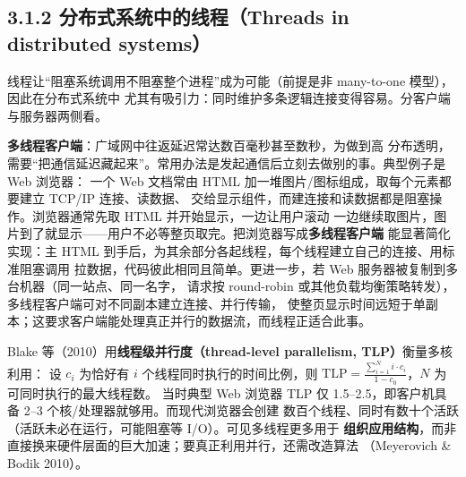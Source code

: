 \begin{closeread}
\end{closeread}


\subsection*{3.1.2 分布式系统中的线程（Threads in distributed systems）}
线程让“阻塞系统调用不阻塞整个进程”成为可能（前提是非 many-to-one 模型），因此在分布式系统中
尤其有吸引力：同时维护多条逻辑连接变得容易。分客户端与服务器两侧看。

\medskip\noindent\textbf{多线程客户端}：广域网中往返延迟常达数百毫秒甚至数秒，为做到高
分布透明，需要“把通信延迟藏起来”。常用办法是发起通信后立刻去做别的事。典型例子是 Web 浏览器：
一个 Web 文档常由 HTML 加一堆图片/图标组成，取每个元素都要建立 TCP/IP 连接、读数据、
交给显示组件，而建连接和读数据都是阻塞操作。浏览器通常先取 HTML 并开始显示，一边让用户滚动
一边继续取图片，图片到了就显示——用户不必等整页取完。把浏览器写成\textbf{多线程客户端}
能显著简化实现：主 HTML 到手后，为其余部分各起线程，每个线程建立自己的连接、用标准阻塞调用
拉数据，代码彼此相同且简单。更进一步，若 Web 服务器被复制到多台机器（同一站点、同一名字，
请求按 round-robin 或其他负载均衡策略转发），多线程客户端可对不同副本建立连接、并行传输，
使整页显示时间远短于单副本；这要求客户端能处理真正并行的数据流，而线程正适合此事。

\begin{ideabox}
Blake 等（2010）用\textbf{线程级并行度（thread-level parallelism, TLP）}衡量多核利用：
设 $c_i$ 为恰好有 $i$ 个线程同时执行的时间比例，则
$\mathrm{TLP}=\frac{\sum_{i=1}^{N} i\cdot c_i}{1-c_0}$，$N$ 为可同时执行的最大线程数。
当时典型 Web 浏览器 TLP 仅 1.5–2.5，即客户机具备 2–3 个核/处理器就够用。而现代浏览器会创建
数百个线程、同时有数十个活跃（活跃未必在运行，可能阻塞等 I/O）。可见多线程更多用于
\textbf{组织应用结构}，而非直接换来硬件层面的巨大加速；要真正利用并行，还需改造算法
（Meyerovich \& Bodik 2010）。
\end{ideabox}


